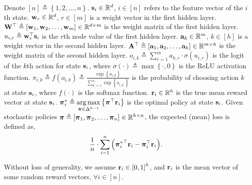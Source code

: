 Denote $[n] \triangleq \left\{ 1,2, \dots, n \right\}$. ${\mathbf{s}}_i \in {\mathbb{R}}^d$, $i \in [n]$ refers to the feature vector of the $i$th state. ${\mathbf{w}}_r \in {\mathbb{R}}^d$, $r \in [m]$ is a weight vector in the first hidden layer. ${\mathbf{W}}^\top \triangleq \left[ {\mathbf{w}}_1, {\mathbf{w}}_2, \dots, {\mathbf{w}}_m \right] \in {\mathbb{R}}^{d \times m}$ is the weight matrix of the first hidden layer. $u_{i,r} \triangleq {\mathbf{w}}_r^\top {\mathbf{s}}_i$ is the $r$th node value of the first hidden layer. ${\mathbf{a}}_k \in {\mathbb{R}}^m$, $k \in [h]$ is a weight vector in the second hidden layer. ${\mathbf{A}}^\top \triangleq \left[ {\mathbf{a}}_1, {\mathbf{a}}_2, \dots, {\mathbf{a}}_h \right] \in {\mathbb{R}}^{m \times h}$ is the weight matrix of the second hidden layer. $o_{i,k} \triangleq \sum\limits_{r=1}^{m}{a_{k,r} \cdot \sigma\left( u_{i,r} \right)}$ is the logit of the $k$th action for state ${\mathbf{s}}_i$, where $\sigma(\cdot) \triangleq \max\left\{ \cdot, 0 \right\}$ is the ReLU activation function. $\pi_{i,k} \triangleq f\left( o_{i,k} \right) \triangleq \frac{\exp\left\{ o_{i,k} \right\}}{\sum\limits_{k^\prime = 1}^{h}{\exp\left\{ o_{i,k^\prime} \right\}}}$ is the probability of choosing action $k$ at state ${\mathbf{s}}_i$, where $f(\cdot)$ is the softmax function. ${\mathbf{r}}_i \in {\mathbb{R}}^h$ is the true mean reward vector at state ${\mathbf{s}}_i$. ${\boldsymbol{\pi}}_i^* \triangleq \operatorname*{arg\,max}\limits_{{\boldsymbol{\pi}} \in \Delta^{h-1}}{\left\{ {\boldsymbol{\pi}}^\top {\mathbf{r}}_i \right\}}$ is the optimal policy at state ${\mathbf{s}}_i$. Given stochastic policies ${\boldsymbol{\pi}} \triangleq \left[ {\boldsymbol{\pi}}_1, {\boldsymbol{\pi}}_2, \dots, {\boldsymbol{\pi}}_n \right] \in {\mathbb{R}}^{h \times n}$, the expected (mean) loss is defined as,
\begin{equation}
\label{eq:expected_loss}
\begin{split}
    \frac{1}{n} \cdot \sum\limits_{i=1}^{n}{ \left( {{\boldsymbol{\pi}}_i^*}^\top {\mathbf{r}}_i - {\boldsymbol{\pi}}_i^\top {\mathbf{r}}_i \right) }.
\end{split}
\end{equation}

Without loss of generality, we assume ${\mathbf{r}}_i \in \left[ 0, 1 \right]^h$, and ${\mathbf{r}}_i$ is the mean vector of some random reward vectors,  $\forall i \in [n]$.